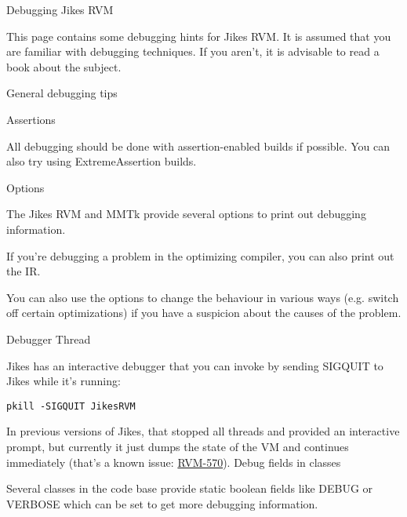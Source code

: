 \begin{chapter}{Debugging Jikes RVM}
\label{cha:debuggingjikesrvm}

This page contains some debugging hints for Jikes RVM. It is assumed that you are familiar with debugging techniques. If you aren't, it is advisable to read a book about the subject.

\begin{section}{General debugging tips}

\begin{subsection}{Assertions}

All debugging should be done with assertion-enabled builds if possible. You can also try using ExtremeAssertion builds.

\end{subsection}

\begin{subsection}{Options}

The Jikes RVM and MMTk provide several options to print out debugging information.

If you're debugging a problem in the optimizing compiler, you can also print out the IR.

You can also use the options to change the behaviour in various ways (e.g. switch off certain optimizations) if you have a suspicion about the causes of the problem.

\end{subsection}

\begin{subsection}{Debugger Thread}

Jikes has an interactive debugger that you can invoke by sending SIGQUIT to Jikes while it's running:

\begin{lstlisting}
pkill -SIGQUIT JikesRVM
\end{lstlisting}

In previous versions of Jikes, that stopped all threads and provided an interactive prompt, but currently it just dumps the state of the VM and continues immediately (that's a known issue: \href{https://xtenlang.atlassian.net/browse/RVM-570}{RVM-570}).
Debug fields in classes

Several classes in the code base provide static boolean fields like DEBUG or VERBOSE which can be set to get more debugging information.

\end{subsection}


\end{section}
\end{chapter}
